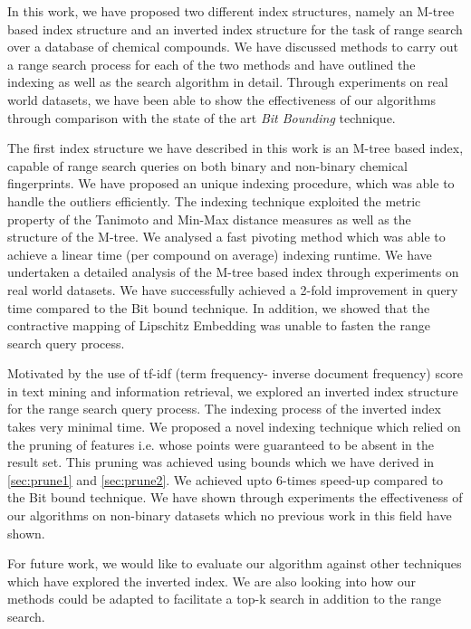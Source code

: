 %
%
In this work, we have proposed two different index structures, namely an M-tree based index structure and an inverted index structure for the task of range search over a database of chemical compounds. We have discussed methods to carry out a range search process for each of the two methods and have outlined the indexing as well as the search algorithm in detail. Through experiments on real world datasets, we have been able to show the effectiveness of our algorithms through comparison with the state of the art\textit{ Bit Bounding} technique.

The first index structure we have described in this work is an  M-tree based index, capable of range search queries on both binary and non-binary chemical fingerprints. We have proposed an unique indexing procedure, which was able to handle the outliers efficiently. The indexing technique exploited the metric property of the Tanimoto and Min-Max distance measures as well as the structure of the M-tree. We analysed a fast pivoting method which was able to achieve a linear time (per compound on average) indexing runtime. We have undertaken a detailed analysis of the M-tree based index through experiments on real world datasets. We have successfully achieved a 2-fold improvement in query time compared to the Bit bound technique. In addition, we showed that the contractive mapping of Lipschitz Embedding was unable to fasten the range search query process. 

Motivated by the use of tf-idf (term frequency- inverse document frequency) score in text mining and information retrieval, we explored an inverted index structure for the range search query process. The indexing process of the inverted index takes very minimal time. We proposed a novel indexing technique which relied on the pruning of features i.e. whose points were guaranteed to be absent in the result set. This pruning was achieved using bounds which we have derived in \autoref{sec:prune1} and \autoref{sec:prune2}. We achieved upto 6-times speed-up compared to the Bit bound technique. We have shown through experiments the effectiveness of our algorithms on non-binary datasets which no previous work in this field have shown. 
 
For future work, we would like to evaluate our algorithm against other techniques which have explored the inverted index. We are also looking into how our methods could be adapted to facilitate a top-k search in addition to the range search. 

